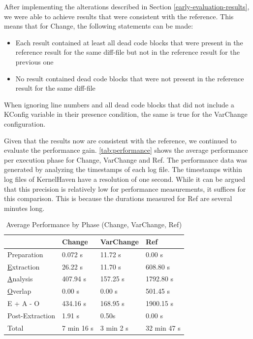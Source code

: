 \documentclass[a4paper]{article}
\begin{document}
After implementing the alterations described in Section \ref{early-evaluation-results}, we were able to achieve results that were consistent with the reference. This means that for Change, the following statements can be made:

\begin{itemize}
   \item Each result contained at least all dead code blocks that were present in the reference result for the same diff-file but not in the reference result for the previous one
   \item No result contained dead code blocks that were not present in the reference result for the same diff-file
\end{itemize}

When ignoring line numbers and all dead code blocks that did not include a KConfig variable in their presence condition, the same is true for the VarChange configuration. 

Given that the results now are consistent with the reference, we continued to evaluate the performance gain. \autoref{tab:performance} shows the average performance per execution phase for Change, VarChange and  Ref. The performance data was generated by analyzing the timestamps of each log file. The timestamps within log files of KernelHaven have a resolution of one second. While it can be argued that this precision is relatively low for performance measurements, it suffices for this comparison. This is because the durations measured for Ref are several minutes long.

\begin {table}[h]
\begin{center}
\caption {Average Performance by Phase (Change, VarChange, Ref)} \label{tab:performance} 
\begin{tabular}{|l | l | l | l|}
\hline
                               & Change                 & VarChange          & Ref  \\ \hline
	Preparation                & 0.072 s                & 11.72 s            & 0.00 s \\
	\underline{E}xtraction     & 26.22 s                & 11.70 s            & 608.80 s \\
	\underline{A}nalysis       & 407.94 s               & 157.25 s           & 1792.80 s \\
	\underline{O}verlap        & 0.00 s                 & 0.00 s             & 501.45 s \\
	E + A - O                  & 434.16 s               & 168.95 s           & 1900.15 s \\
	Post-Extraction             & 1.91 s                 & 0.50s              & 0.00 s \\ \hline
	Total                      & 7 min 16 s             & 3 min 2 s          & 32 min 47 s \\ \hline
\end{tabular}
\end{center}
\end{table}
\end{document}
